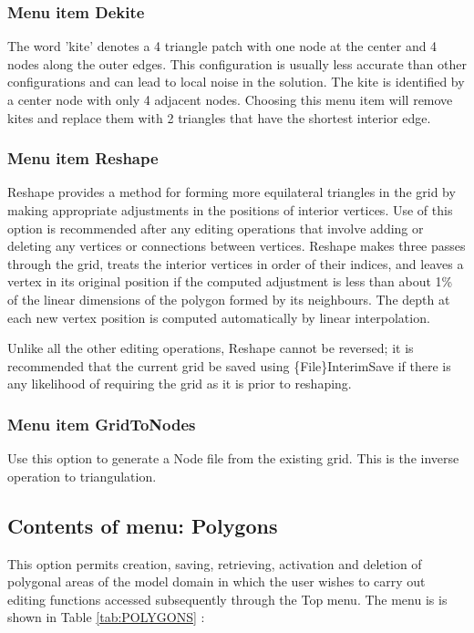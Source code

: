 \documentclass{article}
\begin{document}
\subsubsection[Menu item Dekite]{Menu item Dekite}
The word 'kite' denotes a 4 triangle patch with one node at the center and 4 nodes along the outer edges. This configuration is usually less accurate than other configurations and can lead to local noise in the solution. The kite is identified by a center node with only 4 adjacent nodes. Choosing this menu item will remove kites and replace them with 2 triangles that have the shortest interior edge.

\subsubsection[Menu item Reshape]{Menu item Reshape}
Reshape provides a method for forming more equilateral triangles in the grid by making appropriate adjustments in the positions of interior vertices. Use of this option is recommended after any editing operations that involve adding or deleting any vertices or connections between vertices. Reshape makes three passes through the grid, treats the interior vertices in order of their indices, and leaves a vertex in its original position if the computed adjustment is less than about 1\% of the linear dimensions of the polygon formed by its neighbours. The depth at each new vertex position is computed automatically by linear interpolation.

Unlike all the other editing operations, Reshape cannot be reversed; it is recommended that the current grid be saved using \{File\}InterimSave if there is any likelihood of requiring the grid as it is prior to reshaping.

\subsubsection[Menu item GridToNodes]{Menu item GridToNodes}
Use this option to generate a Node file from the existing grid. This is the inverse operation to triangulation.


\subsection{Contents of menu: Polygons}
This option permits creation, saving, retrieving, activation and deletion of polygonal areas of the model domain in which the user wishes to carry out editing functions accessed subsequently through the Top menu. The menu is is shown in Table \ref{tab:POLYGONS} :
\end{document}
